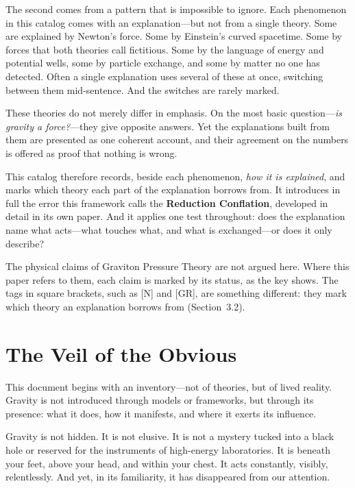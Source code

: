 \documentclass[11pt,a4paper]{article}
\begin{document}
The second comes from a pattern that is impossible to ignore. Each phenomenon in this catalog comes with an explanation---but not from a single theory. Some are explained by Newton's force. Some by Einstein's curved spacetime. Some by forces that both theories call fictitious. Some by the language of energy and potential wells, some by particle exchange, and some by matter no one has detected. Often a single explanation uses several of these at once, switching between them mid-sentence. And the switches are rarely marked.

These theories do not merely differ in emphasis. On the most basic question---\emph{is gravity a force?}---they give opposite answers. Yet the explanations built from them are presented as one coherent account, and their agreement on the numbers is offered as proof that nothing is wrong.

This catalog therefore records, beside each phenomenon, \emph{how it is explained}, and marks which theory each part of the explanation borrows from. It introduces in full the error this framework calls the \textbf{Reduction Conflation}, developed in detail in its own paper. And it applies one test throughout: does the explanation name what acts---what touches what, and what is exchanged---or does it only describe?

The physical claims of Graviton Pressure Theory are not argued here. Where this paper refers to them, each claim is marked by its status, as the key shows. The tags in square brackets, such as [N] and [GR], are something different: they mark which theory an explanation borrows from (Section~3.2).

\statuskey

\section*{The Veil of the Obvious}

This document begins with an inventory---not of theories, but of lived reality. Gravity is not introduced through models or frameworks, but through its presence: what it does, how it manifests, and where it exerts its influence.

Gravity is not hidden. It is not elusive. It is not a mystery tucked into a black hole or reserved for the instruments of high-energy laboratories. It is beneath your feet, above your head, and within your chest. It acts constantly, visibly, relentlessly. And yet, in its familiarity, it has disappeared from our attention.
\end{document}
